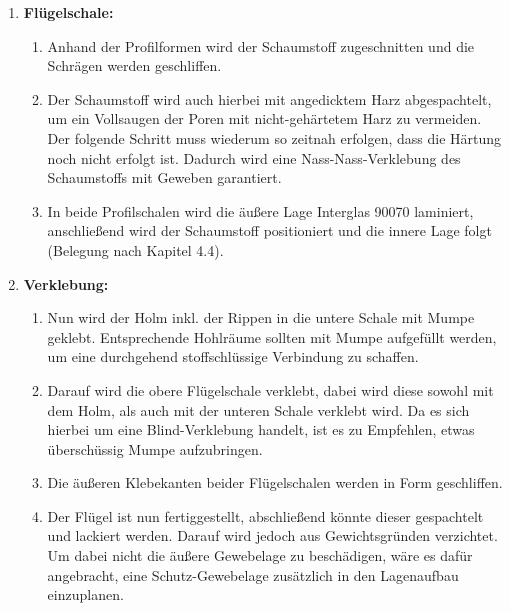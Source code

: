 \begin{enumerate}
\begin{enumerate}
	\end{enumerate}
	\item \textbf{Flügelschale:}
	\begin{enumerate}
		\item Anhand der Profilformen wird der Schaumstoff zugeschnitten und die Schrägen werden geschliffen.
		\item Der Schaumstoff wird auch hierbei mit angedicktem Harz \glqq abgespachtelt\grqq, um ein Vollsaugen der Poren mit nicht-gehärtetem Harz zu vermeiden. Der folgende Schritt muss wiederum so zeitnah erfolgen, dass die Härtung noch nicht erfolgt ist. Dadurch wird eine Nass-Nass-Verklebung des Schaumstoffs mit Geweben garantiert.
		\item In beide Profilschalen wird die äußere Lage Interglas 90070 laminiert, anschließend wird der Schaumstoff positioniert und die innere Lage folgt (Belegung nach Kapitel 4.4).
	\end{enumerate}
	\item \textbf{Verklebung:}
	\begin{enumerate}
		\item Nun wird der Holm inkl. der Rippen in die untere Schale mit Mumpe geklebt. Entsprechende Hohlräume sollten mit Mumpe aufgefüllt werden, um eine durchgehend stoffschlüssige Verbindung zu schaffen.
		\item Darauf wird die obere Flügelschale verklebt, dabei wird diese sowohl mit dem Holm, als auch mit der unteren Schale verklebt wird. Da es sich hierbei um eine Blind-Verklebung handelt, ist es zu Empfehlen, etwas überschüssig Mumpe aufzubringen.
		\item Die äußeren Klebekanten beider Flügelschalen werden in Form geschliffen.
		\item Der Flügel ist nun fertiggestellt, abschließend könnte dieser gespachtelt und lackiert werden. Darauf wird jedoch aus Gewichtsgründen verzichtet. Um dabei nicht die äußere Gewebelage zu beschädigen, wäre es dafür angebracht, eine Schutz-Gewebelage zusätzlich in den Lagenaufbau einzuplanen.
	\end{enumerate}
\end{enumerate}

